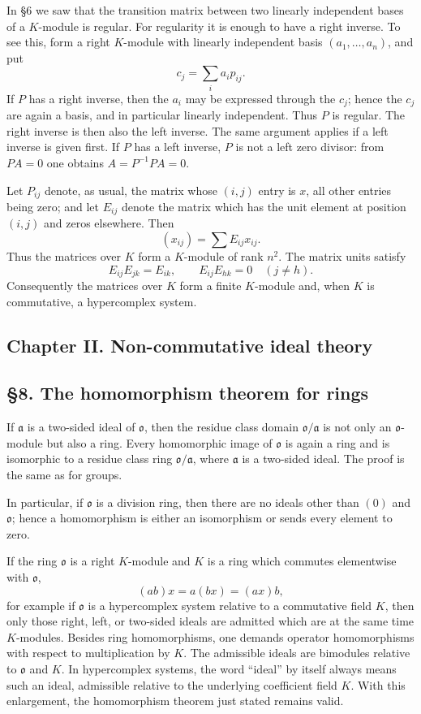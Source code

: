 \documentclass[
  11pt,
]{article}
\begin{document}
In §6 we saw that the transition matrix between two linearly independent
bases of a \(K\)-module is regular. For regularity it is enough to have
a right inverse. To see this, form a right \(K\)-module with linearly
independent basis \((a_1,\ldots,a_n)\), and put \[
  c_j=\sum_i a_i p_{ij}.
\] If \(P\) has a right inverse, then the \(a_i\) may be expressed
through the \(c_j\); hence the \(c_j\) are again a basis, and in
particular linearly independent. Thus \(P\) is regular. The right
inverse is then also the left inverse. The same argument applies if a
left inverse is given first. If \(P\) has a left inverse, \(P\) is not a
left zero divisor: from \(PA=0\) one obtains \(A=P^{-1}PA=0\).

Let \(P_{ij}\) denote, as usual, the matrix whose \((i,j)\) entry is
\(x\), all other entries being zero; and let \(E_{ij}\) denote the
matrix which has the unit element at position \((i,j)\) and zeros
elsewhere. Then \[
  (x_{ij})=\sum E_{ij}x_{ij}.
\] Thus the matrices over \(K\) form a \(K\)-module of rank \(n^2\). The
matrix units satisfy \[
  E_{ij}E_{jk}=E_{ik},
  \qquad
  E_{ij}E_{hk}=0\quad (j\ne h).
\] Consequently the matrices over \(K\) form a finite \(K\)-module and,
when \(K\) is commutative, a hypercomplex system.

\subsection{Chapter II. Non-commutative ideal
theory}\label{chapter-ii.-non-commutative-ideal-theory}

\subsection{§8. The homomorphism theorem for
rings}\label{the-homomorphism-theorem-for-rings}

If \(\mathfrak a\) is a two-sided ideal of \(\mathfrak{o}\), then the
residue class domain \(\mathfrak{o}/\mathfrak a\) is not only an
\(\mathfrak{o}\)-module but also a ring. Every homomorphic image of
\(\mathfrak{o}\) is again a ring and is isomorphic to a residue class
ring \(\mathfrak{o}/\mathfrak a\), where \(\mathfrak a\) is a two-sided
ideal. The proof is the same as for groups.

In particular, if \(\mathfrak{o}\) is a division ring, then there are no
ideals other than \((0)\) and \(\mathfrak{o}\); hence a homomorphism is
either an isomorphism or sends every element to zero.

If the ring \(\mathfrak{o}\) is a right \(K\)-module and \(K\) is a ring
which commutes elementwise with \(\mathfrak{o}\), \[
  (ab)x=a(bx)=(ax)b,
\] for example if \(\mathfrak{o}\) is a hypercomplex system relative to
a commutative field \(K\), then only those right, left, or two-sided
ideals are admitted which are at the same time \(K\)-modules. Besides
ring homomorphisms, one demands operator homomorphisms with respect to
multiplication by \(K\). The admissible ideals are bimodules relative to
\(\mathfrak{o}\) and \(K\). In hypercomplex systems, the word ``ideal''
by itself always means such an ideal, admissible relative to the
underlying coefficient field \(K\). With this enlargement, the
homomorphism theorem just stated remains valid.
\end{document}
